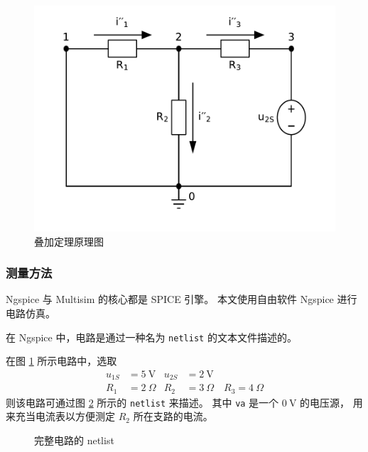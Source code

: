 \documentclass[UTF8,linespread=1.236]{ctexart}
\newcommand\unitV{\:\mathrm{V}}
\newcommand\unitOhm{\:\Omega}
\begin{document}
\begin{figure}[htbp]
{\begin{minipage}{0.29\textwidth}
    \includegraphics[width=\textwidth]{vs2.pdf}
\end{minipage}}
\caption{叠加定理原理图}\label{circuits}
\end{figure}

\subsubsection{测量方法}

Ngspice 与 Multisim 的核心都是 SPICE 引擎。
本文使用自由软件 Ngspice 进行电路仿真。

在 Ngspice 中，电路是通过一种名为 \verb|netlist| 的文本文件描述的。

在图 \ref{circuits} 所示电路中，选取
\[
\begin{aligned}
u_{1S} &= 5 \unitV & u_{2S} &= 2 \unitV \\
R_1 &= 2 \unitOhm & R_2 &= 3 \unitOhm \quad R_3 = 4 \unitOhm
\end{aligned}
\]
则该电路可通过图 \ref{netlistfile} 所示的 \verb|netlist| 来描述。
其中 \verb|va| 是一个 $0\unitV$ 的电压源，
用来充当电流表以方便测定 $R_2$ 所在支路的电流。

\begin{figure}[!htbp]
\centering
{}
\caption{完整电路的 netlist}\label{netlistfile}
\end{figure}
\end{document}
